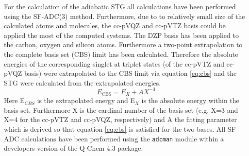 \documentclass[aip,graphicx,amsmath,reprint]{revtex4-1}
\begin{document}
For the calculation of the adiabatic STG all calculations have been performed using the SF-ADC(3)\cite{Lefrancois2015} method. Furthermore, due to to relatively small size of the calculated atoms and molecules, the cc-pVQZ and cc-pVTZ\cite{Dunning1989} basis could be applied the most of the computed systems. The DZP basis has been applied to the carbon, oxygen and silicon atoms. Furthermore a two-point extrapolation to the complete basis set (CBS) limit has been calculated. Therefore the absolute energies of the corresponding singlet at triplet states (of the cc-pVTZ and cc-pVQZ basis) were extrapolated to the CBS limit via equation \eqref{eq:cbs} and the STG were calculated from the extrapolated energies. 
\begin{equation}
E_{{\text{CBS}}} = E_X+AX^{-3}
\label{eq:cbs}
\end{equation}
Here E$_{CBS}$ is the extrapolated energy and E$_X$ is the absolute energy within the basis set. Furthermore X is the cardinal number of the basis set (e.g. X=3 and X=4 for the cc-pVTZ and cc-pVQZ, respectively) and A the fitting parameter which is derived so that equation \eqref{eq:cbs} is satisfied for the two bases.
All SF-ADC calculations have been performed using the \texttt{adcman} module within a developers version of the \mbox{Q-Chem} 4.3\cite{qchem2015} package.
\end{document}
